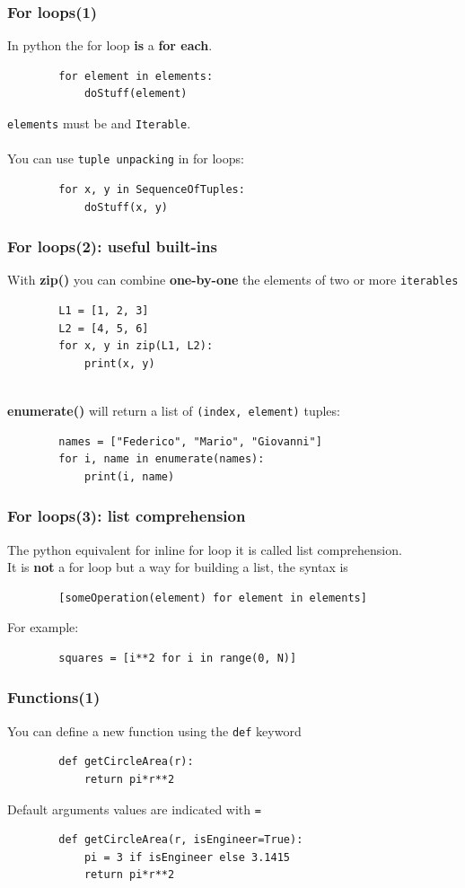 \documentclass{beamer}
\begin{document}
\begin{frame}[fragile]
    \frametitle{For loops(1)}
    In python the for loop \textbf{is} a \textbf{for each}.
    \begin{verbatim}
        for element in elements:
            doStuff(element)
    \end{verbatim}
    \texttt{elements} must be and \texttt{Iterable}.\\
    \hfill \\
    You can use \texttt{tuple unpacking} in for loops: 
    \begin{verbatim}
        for x, y in SequenceOfTuples:
            doStuff(x, y)
    \end{verbatim}
\end{frame}

\begin{frame}[fragile]
    \frametitle{For loops(2): useful built-ins}
    With \textbf{zip()} you can combine \textbf{one-by-one} the elements of two or more \texttt{iterables} 
    \begin{verbatim}
        L1 = [1, 2, 3]
        L2 = [4, 5, 6]
        for x, y in zip(L1, L2): 
            print(x, y)
    \end{verbatim}
    \hfill \\
    \textbf{enumerate()} will return a list of \texttt{(index, element)} tuples: 
    \begin{verbatim}
        names = ["Federico", "Mario", "Giovanni"]
        for i, name in enumerate(names):
            print(i, name)
    \end{verbatim}
\end{frame}

\begin{frame}[fragile]
    \frametitle{For loops(3): list comprehension}
    The python equivalent for inline for loop it is called  list comprehension.\\
    It is \textbf{not} a for loop but a way for building a list, the syntax is
    \begin{verbatim}
        [someOperation(element) for element in elements]
    \end{verbatim}
    For example:
    \begin{verbatim}
        squares = [i**2 for i in range(0, N)]
    \end{verbatim}
\end{frame}

\begin{frame}[fragile]
    \frametitle{Functions(1)}
    You can define a new function using the \texttt{def} keyword
    \begin{verbatim}
        def getCircleArea(r):
            return pi*r**2
    \end{verbatim}
    Default arguments values are indicated with \texttt{=}
    \begin{verbatim}
        def getCircleArea(r, isEngineer=True):
            pi = 3 if isEngineer else 3.1415
            return pi*r**2
    \end{verbatim}
\end{frame}
\end{document}
